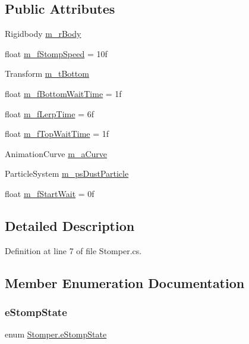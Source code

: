 \subsection*{Public Attributes}
\begin{DoxyCompactItemize}
\item 
Rigidbody \mbox{\hyperlink{class_stomper_a7da016f677f4790bf788148c111f91b8}{m\+\_\+r\+Body}}
\item 
float \mbox{\hyperlink{class_stomper_a6a6d454eff5ecbf9cf1dc78a984e26b6}{m\+\_\+f\+Stomp\+Speed}} = 10f
\item 
Transform \mbox{\hyperlink{class_stomper_aa2600c8a8e29d398ffe137de4758778c}{m\+\_\+t\+Bottom}}
\item 
float \mbox{\hyperlink{class_stomper_a742e053718f2ebe038939111ca82e145}{m\+\_\+f\+Bottom\+Wait\+Time}} = 1f
\item 
float \mbox{\hyperlink{class_stomper_aceefb2a1222aa344e4b9ccc27c039dcf}{m\+\_\+f\+Lerp\+Time}} = 6f
\item 
float \mbox{\hyperlink{class_stomper_a8028ba092cfd285cbe34f6c412139117}{m\+\_\+f\+Top\+Wait\+Time}} = 1f
\item 
Animation\+Curve \mbox{\hyperlink{class_stomper_a4b0c5cafe1628a7ad76f5ad8960df5d6}{m\+\_\+a\+Curve}}
\item 
Particle\+System \mbox{\hyperlink{class_stomper_a4925fffe3de9b6947c48143d3aa70faf}{m\+\_\+ps\+Dust\+Particle}}
\item 
float \mbox{\hyperlink{class_stomper_a630b141381162d3d49fa54b6b5091367}{m\+\_\+f\+Start\+Wait}} = 0f
\end{DoxyCompactItemize}


\subsection{Detailed Description}




Definition at line 7 of file Stomper.\+cs.



\subsection{Member Enumeration Documentation}
\mbox{\label{class_stomper_aae04e54d13bcee7c7b32dbea23aebcb3}} 
\subsubsection{\texorpdfstring{e\+Stomp\+State}{eStompState}}
{\footnotesize\ttfamily enum \mbox{\hyperlink{class_stomper_aae04e54d13bcee7c7b32dbea23aebcb3}{Stomper.\+e\+Stomp\+State}}\hspace{0.3cm}{\ttfamily [strong]}}

